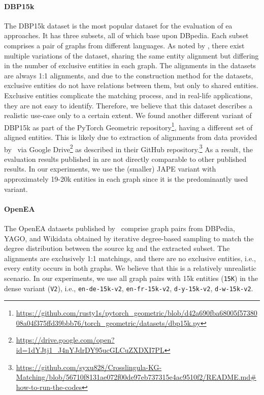 \documentclass[runningheads]{llncs}
\begin{document}
\paragraph{DBP15k}
The DBP15k dataset is the most popular dataset for the evaluation of \gls{ea} approaches.
It has three subsets, all of which base upon DBpedia. 
Each subset comprises a pair of graphs from different languages. 
As noted by \cite{DBLP:conf/ecir/BerrendorfFMT020}, there exist multiple variations of the dataset, sharing the same entity alignment but differing in the number of exclusive entities in each graph.
The alignments in the datasets are always 1:1 alignments, and due to the construction method for the datasets, exclusive entities do not have relations between them, but only to shared entities. 
Exclusive entities complicate the matching process, and in real-life applications, they are not easy to identify.
Therefore, we believe that this dataset describes a realistic use-case only to a certain extent.
We found another different variant of DBP15k as part of the PyTorch Geometric repository\footnote{\url{https://github.com/rusty1s/pytorch\_geometric/blob/d42a690fba68005f5738008a04f375ffd39bbb76/torch\_geometric/datasets/dbp15k.py}}, having a different set of aligned entities.
This is likely due to extraction of alignments from data provided by~\cite{DBLP:conf/acl/XuWYFSWY19} via Google Drive\footnote{\url{https://drive.google.com/open?id=1dYJtj1\_J4nYJdrDY95ucGLCuZXDXI7PL}} as described in their GitHub repository.\footnote{\url{https://github.com/syxu828/Crosslingula-KG-Matching/blob/56710f8131ae072f00de97eb737315e4ac9510f2/README.md\#how-to-run-the-codes}}
As a result, the evaluation results published in \cite{DBLP:conf/iclr/FeyL0MK20} are not directly comparable to other published results. 
In our experiments, we use the (smaller) JAPE variant with approximately 19-20k entities in each graph since it is the predominantly used variant.

\paragraph{OpenEA}
The OpenEA datasets published by~\cite{DBLP:journals/pvldb/SunZHWCAL20} comprise graph pairs from DBPedia, YAGO, and Wikidata obtained by iterative degree-based sampling to match the degree distribution between the source \gls{kg} and the extracted subset.
The alignments are exclusively 1:1 matchings, and there are no exclusive entities, i.e., every entity occurs in both graphs.
We believe that this is a relatively unrealistic scenario.
In our experiments, we use all graph pairs with 15k entities (\texttt{15K}) in the dense variant (\texttt{V2}), i.e., \texttt{en-de-15k-v2}, \texttt{en-fr-15k-v2}, \texttt{d-y-15k-v2}, \texttt{d-w-15k-v2}.
\end{document}
